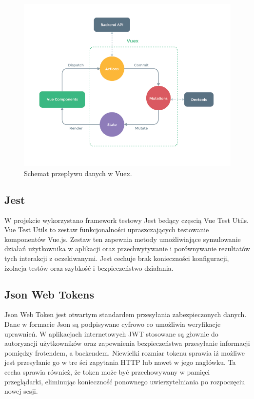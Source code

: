 \begin{figure}[t]
\centering\includegraphics[width=\textwidth]{figures/vuex}
\caption{Schemat przepływu danych w Vuex.}\label{rys:vuex}
\end{figure}

\subsection{Jest}
W projekcie wykorzystano framework testowy Jest bedący częscią Vue Test Utils. Vue Test Utils to zestaw funkcjonalności upraszczających testowanie komponentów Vue.js. Zestaw ten zapewnia metody umożliwiające symulowanie działań użytkownika w aplikacji oraz przechwytywanie i porównywanie rezultatów tych interakcji z oczekiwanymi. Jest cechuje brak konieczności konfiguracji, izolacja testów oraz szybkość i bezpieczeństwo działania.
\subsection{Json Web Tokens}
Json Web Token jest otwartym standardem przesyłania zabezpieczonych danych. Dane w formacie Json są podpisywane cyfrowo co umożliwia weryfikacje uprawnień. W aplikacjach internetowych JWT stosowane są głownie do autoryzacji użytkowników oraz zapewnienia bezpieczeństwa przesyłanie informacji pomiędzy frotendem, a backendem. Niewielki rozmiar tokenu sprawia iż możliwe jest przesyłanie go w tre ści zapytania HTTP lub nawet w jego nagłówku. Ta cecha sprawia również, że token może być przechowywany w pamięci przeglądarki, eliminując konieczność ponownego uwierzytelniania po rozpoczęciu nowej sesji.
